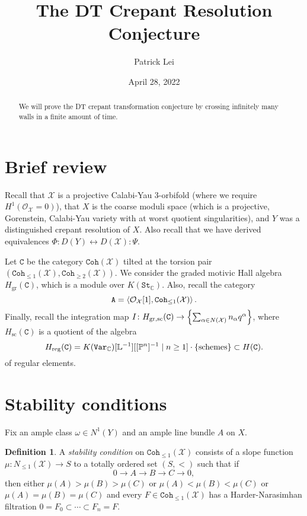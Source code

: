 \documentclass{amsart}
\title{The DT Crepant Resolution Conjecture}
\author{Patrick Lei}
\date{April 28, 2022}
\theoremstyle{definition}
\newtheorem{defn}[thm]{Definition}
\theoremstyle{remark}
\theoremstyle{plain}
\theoremstyle{definition}
\theoremstyle{remark}
\newcommand{\C}{\mathbb{C}}
\renewcommand{\L}{\mathbb{L}}
\renewcommand{\P}{\mathbb{P}}
\newcommand{\mc}[1]{\mathcal{#1}}
\newcommand{\mr}[1]{\mathrm{#1}}
\newcommand{\mt}[1]{\mathtt{#1}}
\newcommand{\1}{\mathbf{1}}
\newcommand{\2}{\mathbf{2}}
\newcommand{\3}{\mathbf{3}}
\begin{document}
    
\maketitle

\begin{abstract}
    We will prove the DT crepant transformation conjecture by crossing infinitely many walls in a finite amount of time.
\end{abstract}

\section{Brief review}

Recall that $\mc{X}$ is a projective Calabi-Yau 3-orbifold (where we require $H^1(\mc{O}_{\mc{X}} = 0)$), that $X$ is the coarse moduli space (which is a projective, Gorenstein, Calabi-Yau variety with at worst quotient singularities), and $Y$ was a distinguished crepant resolution of $X$. Also recall that we have derived equivalences $\Phi \colon D(Y) \leftrightarrow D(\mc{X}) \colon \Psi$.

Let $\mt{C}$ be the category $\mt{Coh}(\mc{X})$ tilted at the torsion pair $(\mt{Coh}_{\leq 1}(\mc{X}), \mt{Coh}_{\geq 2}(\mc{X}))$. We consider the graded motivic Hall algebra $H_{\mr{gr}}(\mt{C})$, which is a module over $K(\mt{St}_{\C})$. Also, recall the category
\[ \mt{A} = \ev{\mc{O}_{\mc{X}}[1], \mt{Coh}_{\leq 1}(\mc{X})}. \]
Finally, recall the integration map $I \colon H_{\mr{gr,sc}}(\mt{C}) \to \qty{\sum_{\alpha \in N(\mc{X})} n_{\alpha} q^{\alpha}}$, where $H_{\mr{sc}}(\mt{C})$ is a quotient of the algebra 
\[ H_{\mr{reg}}(\mt{C}) = K(\mt{Var}_{\C})[\L^{-1}][[\P^n]^{-1} \mid n \geq 1] \cdot \qty{\text{schemes}} \subset H(\mt{C}). \]
of regular elements.

\section{Stability conditions}

Fix an ample class $\omega \in N^1(Y)$ and an ample line bundle $A$ on $X$.

\begin{defn}
    A \textit{stability condition} on $\mt{Coh}_{\leq 1}(\mc{X})$ consists of a slope function $\mu \colon N_{\leq 1}(\mc{X}) \to S$ to a totally ordered set $(S, <)$ such that if
    \[ 0 \to A \to B \to C \to 0, \]
    then either $\mu(A) > \mu(B) > \mu(C)$ or $\mu(A) < \mu(B) < \mu(C)$ or $\mu(A) = \mu(B) = \mu(C)$ and every $F \in \mt{Coh}_{\leq 1}(\mc{X})$ has a Harder-Narasimhan filtration $0 = F_0 \subset \cdots \subset F_n = F$.
\end{defn}
\end{document}
